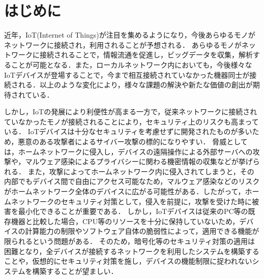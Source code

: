 \documentclass[Japanese]{dicomopapers}
\begin{document}
\section{はじめに}
近年，IoT(Internet of Things)が注目を集めるようになり，今後あらゆるモノがネットワークに接続され，利用されることが予想される．
あらゆるモノがネットワークに接続されることで，情報流通を促進し，ビッグデータを収集，解析することが可能となる．また，ローカルネットワーク内においても，今後様々なIoTデバイスが登場することで，今まで相互接続されていなかった機器同士が接続される．以上のような変化により，様々な課題の解決や新たな価値の創出が期待されている．\par
しかし，IoTの発展により利便性が高まる一方で，従来ネットワークに接続されていなかったモノが接続されることにより，セキュリティ上のリスクも高まっている\cite{security}．
IoTデバイスは十分なセキュリティを考慮せずに開発されたものが多いため，悪意のある攻撃者によるサイバー攻撃の標的になりやすい．
脅威としては，ホームネットワークに侵入し，デバイスの遠隔操作による外部サーバへの攻撃や，マルウェア感染によるプライバシーに関わる機密情報の収集などが挙げられる．
また，攻撃によってホームネットワーク内に侵入されてしまうと，その内部でもデバイス間で自由にアクセス可能なため，マルウェア感染などのリスクがホームネットワーク全体のデバイスに広がる可能性がある．したがって，ホームネットワークのセキュリティ対策として，侵入を前提に，攻撃を受けた時に被害を最小化できることが重要である．
しかし，IoTデバイスは従来のPC等の既存機器と比較した場合，CPU等のリソースを十分に保持していないため，デバイスの計算能力の制限やソフトウェア自体の脆弱性によって，適用できる機能が限られるという問題がある\cite{disap}．
そのため，暗号化等のセキュリティ対策の適用は困難となり，全デバイスが接続するネットワークを利用したシステムを構築することや，仮想的にセキュリティ対策を施し，デバイスの機能制限に捉われないシステムを構築することが望ましい．\par
\end{document}
